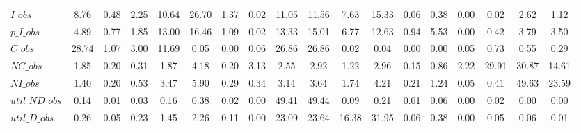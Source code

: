 \begin{center}
\begin{longtable}{lccccccccccccccccc}
$I\_obs         $	 & 	            8.76	 & 	            0.48	 & 	            2.25	 & 	           10.64	 & 	           26.70	 & 	            1.37	 & 	            0.02	 & 	           11.05	 & 	           11.56	 & 	            7.63	 & 	           15.33	 & 	            0.06	 & 	            0.38	 & 	            0.00	 & 	            0.02	 & 	            2.62	 & 	            1.12 \\ 
$p\_I\_obs      $	 & 	            4.89	 & 	            0.77	 & 	            1.85	 & 	           13.00	 & 	           16.46	 & 	            1.09	 & 	            0.02	 & 	           13.33	 & 	           15.01	 & 	            6.77	 & 	           12.63	 & 	            0.94	 & 	            5.53	 & 	            0.00	 & 	            0.42	 & 	            3.79	 & 	            3.50 \\ 
$C\_obs         $	 & 	           28.74	 & 	            1.07	 & 	            3.00	 & 	           11.69	 & 	            0.05	 & 	            0.00	 & 	            0.06	 & 	           26.86	 & 	           26.86	 & 	            0.02	 & 	            0.04	 & 	            0.00	 & 	            0.00	 & 	            0.05	 & 	            0.73	 & 	            0.55	 & 	            0.29 \\ 
$NC\_obs        $	 & 	            1.85	 & 	            0.20	 & 	            0.31	 & 	            1.87	 & 	            4.18	 & 	            0.20	 & 	            3.13	 & 	            2.55	 & 	            2.92	 & 	            1.22	 & 	            2.96	 & 	            0.15	 & 	            0.86	 & 	            2.22	 & 	           29.91	 & 	           30.87	 & 	           14.61 \\ 
$NI\_obs        $	 & 	            1.40	 & 	            0.20	 & 	            0.53	 & 	            3.47	 & 	            5.90	 & 	            0.29	 & 	            0.34	 & 	            3.14	 & 	            3.64	 & 	            1.74	 & 	            4.21	 & 	            0.21	 & 	            1.24	 & 	            0.05	 & 	            0.41	 & 	           49.63	 & 	           23.59 \\ 
$util\_ND\_obs  $	 & 	            0.14	 & 	            0.01	 & 	            0.03	 & 	            0.16	 & 	            0.38	 & 	            0.02	 & 	            0.00	 & 	           49.41	 & 	           49.44	 & 	            0.09	 & 	            0.21	 & 	            0.01	 & 	            0.06	 & 	            0.00	 & 	            0.02	 & 	            0.00	 & 	            0.00 \\ 
$util\_D\_obs   $	 & 	            0.26	 & 	            0.05	 & 	            0.23	 & 	            1.45	 & 	            2.26	 & 	            0.11	 & 	            0.00	 & 	           23.09	 & 	           23.64	 & 	           16.38	 & 	           31.95	 & 	            0.06	 & 	            0.38	 & 	            0.00	 & 	            0.05	 & 	            0.06	 & 	            0.01 \\ 

\end{longtable}
\end{center}
